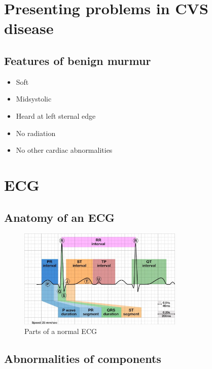 \documentclass[
  12pt,
]{memoir}
\providecommand{\tightlist}{%
  \setlength{\itemsep}{0pt}\setlength{\parskip}{0pt}}
\begin{document}
\hypertarget{presenting-problems-in-cvs-disease}{%
\section{Presenting problems in CVS
disease}\label{presenting-problems-in-cvs-disease}}

\hypertarget{features-of-benign-murmur}{%
\subsection{Features of benign murmur}\label{features-of-benign-murmur}}

\begin{itemize}
\tightlist
\item
  Soft
\item
  Midsystolic
\item
  Heard at left sternal edge
\item
  No radiation
\item
  No other cardiac abnormalities
\end{itemize}

\hypertarget{ecg}{%
\section{ECG}\label{ecg}}

\hypertarget{anatomy-of-an-ecg}{%
\subsection{Anatomy of an ECG}\label{anatomy-of-an-ecg}}

\begin{figure}
    \centering
    \includegraphics[width=0.7\textwidth]{../assets/med/ecg-anatomy.jpg}
    \caption{Parts of a normal ECG}
\end{figure}

\hypertarget{abnormalities-of-components}{%
\subsection{Abnormalities of
components}\label{abnormalities-of-components}}
\end{document}
